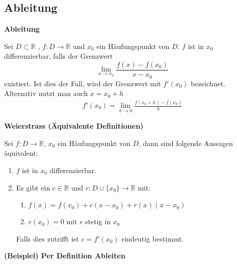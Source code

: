 \documentclass[25pt]{sciposter}
\newcommand{\R}{\mathbb{R}}
\newenvironment{method}[1]{\begin{mdframed}[backgroundcolor=blue!10,innertopmargin=15pt, innerbottommargin=15pt,nobreak=true]
		\textbf{#1 }
	}
	{ 
	\end{mdframed}
}
\begin{document}
\begin{multicols}{3}
\vfill


\newpage













\section{Ableitung}

\begin{method}{Ableitung}
	Sei $D \subset \R$ , $f:D \to  \R$ und $x_0$ ein Häufungspunkt von $D$. $f$ ist in $x_0$ differenzierbar, falls der Grenzwert 
	$$ \lim\limits_{x \to x_0} \frac{f(x) -f(x_0)}{x-x_0}$$
	existiert. Ist dies der Fall, wird der Grenzwert mit $f'(x_0)$ bezeichnet.\\
	Alternativ nutzt man auch $x = x_0 + h$
	\begin{align*}
			f'(x_0) = \lim\limits_{h \to 0} \frac{f(x_0 + h) - f(x_0)}{h}
	\end{align*}
\end{method}


\begin{method}{Weierstrass (Äquivalente Definitionen)}
Sei $f : D \to \R$, $x_0$ ein Häufungspunkt von $D$, dann sind folgende Aussagen äquivalent:
\begin{enumerate}
	\item $f$ ist in $x_0$ differenzierbar.
	\item Es gibt ein $c\in \R$ und $r : D \cup \{x_0\} \to \R$ mit:
	\begin{enumerate}
		\item $f(x) = f(x_0) + c(x-x_0) + r(x) (x-x_0)$
		\item $r(x_0) = 0$ mit $r$ stetig in $x_0$
	\end{enumerate}
Falls dies zutrifft ist $c=f'(x_0)$ eindeutig bestimmt.
\end{enumerate}
\end{method}

\textbf{(Beispiel) Per Definition Ableiten}


\end{multicols}
\end{document}
